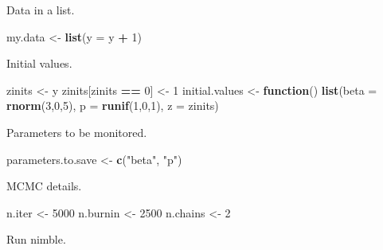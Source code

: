 \documentclass[
  12pt,
]{krantz}
\newenvironment{Shaded}{\begin{snugshade}}{\end{snugshade}}
\newcommand{\AttributeTok}[1]{\textcolor[rgb]{0.13,0.29,0.53}{#1}}
\newcommand{\ControlFlowTok}[1]{\textcolor[rgb]{0.13,0.29,0.53}{\textbf{#1}}}
\newcommand{\DecValTok}[1]{\textcolor[rgb]{0.00,0.00,0.81}{#1}}
\newcommand{\FunctionTok}[1]{\textcolor[rgb]{0.13,0.29,0.53}{\textbf{#1}}}
\newcommand{\NormalTok}[1]{#1}
\newcommand{\OtherTok}[1]{\textcolor[rgb]{0.56,0.35,0.01}{#1}}
\newcommand{\SpecialCharTok}[1]{\textcolor[rgb]{0.81,0.36,0.00}{\textbf{#1}}}
\newcommand{\StringTok}[1]{\textcolor[rgb]{0.31,0.60,0.02}{#1}}
\begin{document}
Data in a list.

\begin{Shaded}
\begin{Highlighting}[]
\NormalTok{my.data }\OtherTok{\textless{}{-}} \FunctionTok{list}\NormalTok{(}\AttributeTok{y =}\NormalTok{ y }\SpecialCharTok{+} \DecValTok{1}\NormalTok{)}
\end{Highlighting}
\end{Shaded}

Initial values.

\begin{Shaded}
\begin{Highlighting}[]
\NormalTok{zinits }\OtherTok{\textless{}{-}}\NormalTok{ y}
\NormalTok{zinits[zinits }\SpecialCharTok{==} \DecValTok{0}\NormalTok{] }\OtherTok{\textless{}{-}} \DecValTok{1}
\NormalTok{initial.values }\OtherTok{\textless{}{-}} \ControlFlowTok{function}\NormalTok{() }\FunctionTok{list}\NormalTok{(}\AttributeTok{beta =} \FunctionTok{rnorm}\NormalTok{(}\DecValTok{3}\NormalTok{,}\DecValTok{0}\NormalTok{,}\DecValTok{5}\NormalTok{),}
                                  \AttributeTok{p =} \FunctionTok{runif}\NormalTok{(}\DecValTok{1}\NormalTok{,}\DecValTok{0}\NormalTok{,}\DecValTok{1}\NormalTok{),}
                                  \AttributeTok{z =}\NormalTok{ zinits)}
\end{Highlighting}
\end{Shaded}

Parameters to be monitored.

\begin{Shaded}
\begin{Highlighting}[]
\NormalTok{parameters.to.save }\OtherTok{\textless{}{-}} \FunctionTok{c}\NormalTok{(}\StringTok{"beta"}\NormalTok{, }\StringTok{"p"}\NormalTok{)}
\end{Highlighting}
\end{Shaded}

MCMC details.

\begin{Shaded}
\begin{Highlighting}[]
\NormalTok{n.iter }\OtherTok{\textless{}{-}} \DecValTok{5000}
\NormalTok{n.burnin }\OtherTok{\textless{}{-}} \DecValTok{2500}
\NormalTok{n.chains }\OtherTok{\textless{}{-}} \DecValTok{2}
\end{Highlighting}
\end{Shaded}

Run nimble.
\end{document}
